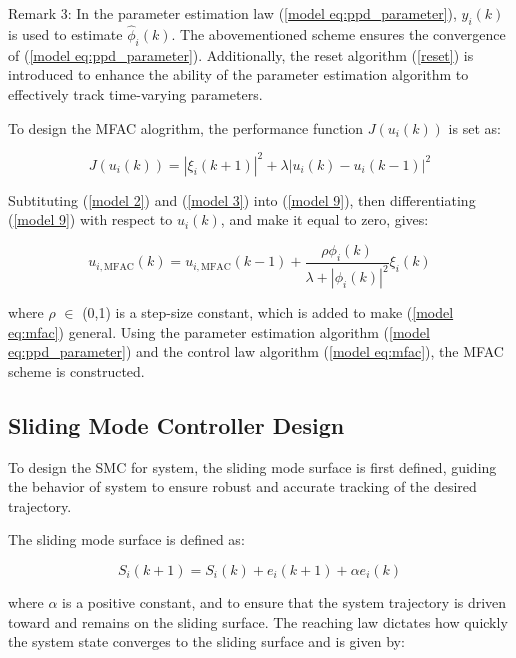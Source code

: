 \documentclass[journal,onecolumn]{IEEEtran}
\begin{document}
Remark 3: In the parameter estimation law (\ref{model eq:ppd_parameter}), $y_i(k) $ is used to estimate $\hat{\phi}_i(k)$. The abovementioned scheme ensures the convergence of (\ref{model eq:ppd_parameter}). Additionally, the reset algorithm (\ref{reset}) is introduced to enhance the ability of the parameter estimation algorithm to effectively track time-varying parameters.


To design the MFAC alogrithm, the performance function \(J(u_i(k))\) is set as:

\begin{equation}
    \label{model 9}
    J(u_i(k)) = |\xi_i(k+1)|^2 + \lambda|u_i(k) - u_i(k-1)|^2
\end{equation}

Subtituting (\ref{model 2}) and (\ref{model 3}) into (\ref{model 9}), then differentiating (\ref{model 9}) with respect to \(u_i(k)\), and make it equal to zero, gives:

\begin{equation}
    \label{model eq:mfac}
    u_{i,\text{MFAC}}(k) = u_{i,\text{MFAC}}(k - 1) + \frac{\rho \phi_i(k)}{\lambda + |\phi_i(k)|^2} \xi_i(k)
\end{equation}


where \(\rho\) \(\in\) (0,1) is a step-size constant, which is added to make (\ref{model eq:mfac}) general. Using the parameter estimation algorithm (\ref{model eq:ppd_parameter}) and the control law algorithm (\ref{model eq:mfac}), the MFAC scheme is constructed. 


\subsection{Sliding Mode Controller Design}







To design the SMC for system, the sliding mode surface is first defined, guiding the behavior of system to ensure robust and accurate tracking of the desired trajectory.

The sliding mode surface is defined as:

\begin{equation}
    \label{model eq:sms}
    S_i(k+1) = S_i(k)+e_i(k+1)+\alpha e_i(k) 
\end{equation}

where \(\alpha\) is a positive constant, and  to ensure that the system trajectory is driven toward and remains on the sliding surface. The reaching law dictates how quickly the system state converges to the sliding surface and is given by:
\end{document}
